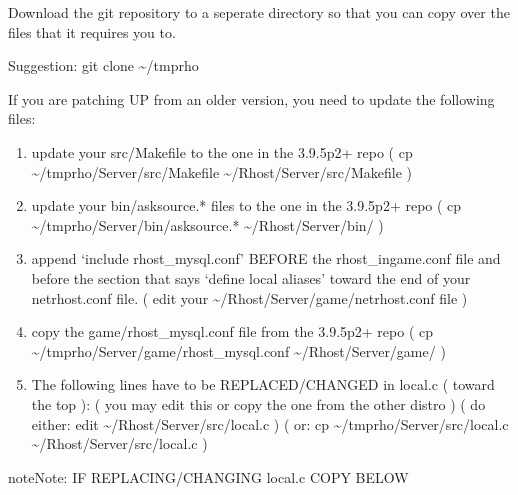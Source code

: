 \documentclass[letterpaper,10pt,english]{sphinxmanual}
\begin{document}
\sphinxAtStartPar
Download the git repository to a seperate directory so that you can
copy over the files that it requires you to.

\sphinxAtStartPar
Suggestion:  git clone  \textasciitilde{}/tmprho

\sphinxAtStartPar
If you are patching UP from an older version, you need to update
the following files:
\begin{enumerate}
%
\item {} 
\sphinxAtStartPar
update your src/Makefile to the one in the 3.9.5p2+ repo
( cp \textasciitilde{}/tmprho/Server/src/Makefile \textasciitilde{}/Rhost/Server/src/Makefile )

\item {} 
\sphinxAtStartPar
update your bin/asksource.* files to the one in the 3.9.5p2+ repo
( cp \textasciitilde{}/tmprho/Server/bin/asksource.* \textasciitilde{}/Rhost/Server/bin/ )

\item {} 
\sphinxAtStartPar
append ‘include rhost\_mysql.conf’ BEFORE the rhost\_ingame.conf file
and before the section that says ‘define local aliases’ toward the end of
your netrhost.conf file.
( edit your \textasciitilde{}/Rhost/Server/game/netrhost.conf file )

\item {} 
\sphinxAtStartPar
copy the game/rhost\_mysql.conf file from the 3.9.5p2+ repo
( cp \textasciitilde{}/tmprho/Server/game/rhost\_mysql.conf \textasciitilde{}/Rhost/Server/game/ )

\item {} 
\sphinxAtStartPar
The following lines have to be REPLACED/CHANGED in local.c ( toward the top ):
( you may edit this or copy the one from the other distro )
( do either:  edit \textasciitilde{}/Rhost/Server/src/local.c )
(        or:  cp \textasciitilde{}/tmprho/Server/src/local.c \textasciitilde{}/Rhost/Server/src/local.c )

\end{enumerate}

\begin{sphinxadmonition}{note}{Note:}
\sphinxAtStartPar
IF REPLACING/CHANGING local.c COPY BELOW
\end{sphinxadmonition}
\end{document}
